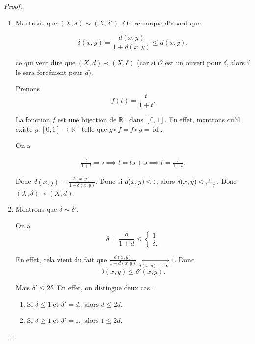 \documentclass[french]{book}
\theoremstyle{definition}
\theoremstyle{remark}
\newcommand{\lesss}{\rotatebox[origin=c]{90}{$\land$}}
\newcommand{\less}{\ \lesss\ }
\begin{document}
\begin{proof}

  \

  \begin{enumerate}
    \item Montrons que \((X, d) \sim (X, \delta')\). On remarque d'abord que

    \[\delta(x,y) = \frac{d(x,y)}{1+ d(x,y)} \leq d(x,y), \]

    ce qui veut dire que \((X, d) \prec (X, \delta)\) (car si \(\mathcal{O}\) est un ouvert pour \(\delta\), alors il le sera forcément pour \(d\)).

    Prenons
    \begin{equation}\label{bij-dist}
      f(t) = \frac{t}{1+t}.
    \end{equation}

    La fonction \(f\) est une bijection de \(\mathbb{R} ^{+}\) dans \([0, 1]\). En effet, montrons qu'il existe \(g : [0, 1] \to \mathbb{R} ^{+}\) telle que $g \circ f = f \circ g = \operatorname{id}$.

    On a

    \begin{gather*}
      \frac{t}{1+t} = s \implies t = ts+s \implies t = \frac{s}{1-s}.
    \end{gather*}

    Donc \(d(x,y) = \frac{\delta(x,y)}{1 - \delta(x,y)}\). Donc si \(d(x,y) \less \varepsilon\), alors \(d(x,y) \less \frac{\varepsilon}{1- \varepsilon}\). Donc \((X,\delta) \prec (X,d)\).

    \item Montrons que \(\delta \sim \delta'\).

    On a \[\delta = \frac{d}{1+d} \leq \begin{cases}
      1 \\
      \delta.
    \end{cases}\]

    En effet, cela vient du fait que \(\frac{d(x,y)}{1+d(x,y)} \underset{d(x,y) \to \infty }{\longrightarrow} 1\). Donc \[\delta(x,y) \leq \delta'(x,y).\]

    Mais \(\delta' \leq 2 \delta\). En effet, on distingue deux cas :

    \begin{enumerate}
      \item Si \(\delta \leq  1 \text{ et } \delta' = d, \text{ alors } d \leq 2 d \),
      \item Si \(\delta \geq  1 \text{ et } \delta' = 1, \text{ alors } 1 \leq 2 d \).
    \end{enumerate}


\end{enumerate}
\end{proof}
\end{document}
